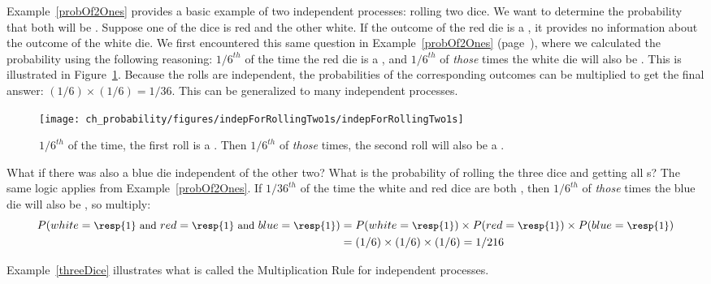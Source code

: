 Example~\ref{probOf2Ones} provides a basic example of two independent processes: rolling two dice. We want to determine the probability that both will be . Suppose one of the dice is red and the other white. If the outcome of the red die is a , it provides no information about the outcome of the white die. We first encountered this same question in Example~\ref{probOf2Ones} (page~\pageref{probOf2Ones}), where we calculated the probability using the following reasoning: $1/6^{th}$ of the time the red die is a , and $1/6^{th}$ of \emph{those} times the white die will also be . This is illustrated in Figure~\ref{indepForRollingTwo1s}. Because the rolls are independent, the probabilities of the corresponding outcomes can be multiplied to get the final answer: $(1/6)\times(1/6)=1/36$. This can be generalized to many independent processes. 

\begin{figure}[hht]
\centering
\texttt{[image: ch\_probability/figures/indepForRollingTwo1s/indepForRollingTwo1s]}
\caption{$1/6^{th}$ of the time, the first roll is a . Then $1/6^{th}$ of \emph{those} times, the second roll will also be a .}
\label{indepForRollingTwo1s}
\end{figure}

\begin{example}{What if there was also a blue die independent of the other two? What is the probability of rolling the three dice and getting all s?}\label{threeDice}
The same logic applies from Example~\ref{probOf2Ones}. If $1/36^{th}$ of the time the white and red dice are both , then $1/6^{th}$ of \emph{those} times the blue die will also be , so multiply:
{\begin{align*}
P(white=\text{\small\resp{1} and } red=\text{\small\resp{1} and } blue=\text{\small\resp{1}})
	&= P(white=\text{\small\resp{1}})\times P(red=\text{\small\resp{1}})\times P(blue=\text{\small\resp{1}}) \\
	&= (1/6)\times (1/6)\times (1/6)
	= 1/216
\end{align*}} \vspace{-7mm}
\end{example}

Example~\ref{threeDice} illustrates what is called the Multiplication Rule for independent processes. 

